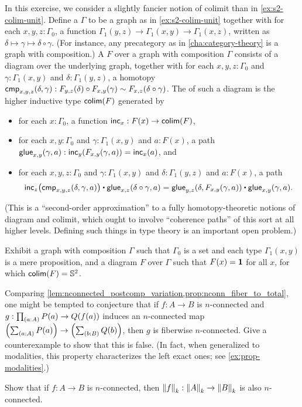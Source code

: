 \begin{ex}\label{ex:s2-colim-unit-2}
  In this exercise, we consider a slightly fancier notion of colimit than in \cref{ex:s2-colim-unit}.
  Define a  $\Gamma$ to be a graph as in \cref{ex:s2-colim-unit} together with for each $x,y,z:\Gamma_0$, a function $\Gamma_1(y,z) \to \Gamma_1(x,y) \to \Gamma_1(x,z)$, written as $\delta\mapsto\gamma \mapsto \delta \circ \gamma$.
  (For instance, any precategory as in \cref{cha:category-theory} is a graph with composition.)
  A  $F$ over a graph with composition $\Gamma$ consists of a diagram over the underlying graph, together with for each $x,y,z:\Gamma_0$ and $\gamma:\Gamma_1(x,y)$ and $\delta:\Gamma_1(y,z)$, a homotopy $\cmp_{x,y,z}(\delta,\gamma) : F_{y,z}(\delta) \circ F_{x,y}(\gamma) \htpy F_{x,z}(\delta\circ\gamma)$.
  The  of such a diagram is the higher inductive type $\colim(F)$ generated by
  \begin{itemize}
  \item for each $x:\Gamma_0$, a function $\inc_x:F(x) \to \colim(F)$,
  \item for each $x,y:\Gamma_0$ and $\gamma:\Gamma_1(x,y)$ and $a:F(x)$, a path $\glue_{x,y}(\gamma,a) : \inc_y(F_{x,y}(\gamma,a)) = \inc_x(a)$, and
  \item for each $x,y,z:\Gamma_0$ and $\gamma:\Gamma_1(x,y)$ and $\delta:\Gamma_1(y,z)$ and $a:F(x)$, a path
    \[ \ap{\inc_z}{\cmp_{x,y,z}(\delta,\gamma,a)} \ct \glue_{x,z}(\delta\circ \gamma,a) = \glue_{y,z}(\delta,F_{x,y}(\gamma,a)) \ct \glue_{x,y}(\gamma,a). \]
  \end{itemize}
  (This is a ``second-order approximation'' to a fully homotopy-theoretic notions of diagram and colimit, which ought to involve ``coherence paths'' of this sort at all higher levels.
  Defining such things in type theory is an important open problem.)

  Exhibit a graph with composition $\Gamma$ such that $\Gamma_0$ is a set and each type $\Gamma_1(x,y)$ is a mere proposition, and a diagram $F$ over $\Gamma$ such that $F(x)=\unit$ for all $x$, for which $\colim(F)=\Sn^2$.
\end{ex}

\begin{ex}\label{ex:fiber-map-not-conn}
  Comparing \cref{lem:nconnected_postcomp_variation,prop:nconn_fiber_to_total}, one might be tempted to conjecture that if $f:A\to B$ is $n$-connected and $g:\prd{a:A} P(a) \to Q(f(a))$ induces an $n$-connected map $\Parens{\sm{a:A} P(a)} \to \Parens{\sm{b:B} Q(b)}$, then $g$ is fiberwise $n$-connected.
  Give a counterexample to show that this is false.
  (In fact, when generalized to modalities, this property characterizes the left exact ones; see \cref{ex:prop-modalities}.)
\end{ex}

\begin{ex}\label{ex:is-conn-trunc-functor}
  Show that if $f : A \to B$ is $n$-connected, then $\trunc kf : \trunc kA \to \trunc kB$ is also $n$-connected.
\end{ex}

